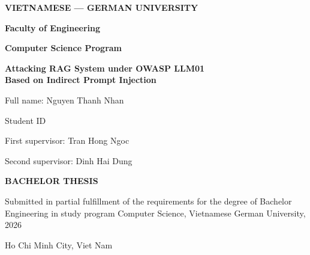 \begin{titlepage}
    \thispagestyle{empty}
    \centering

    {\Large\bfseries VIETNAMESE --- GERMAN UNIVERSITY \par}

    \vspace{1.2cm}

    {\large\bfseries Faculty of Engineering \par}
    \vspace{0.3cm}
    {\large\bfseries Computer Science Program \par}

    \vspace{2.5cm}

    {\Large\bfseries Attacking RAG System under OWASP LLM01\\
    Based on Indirect Prompt Injection \par}

    \vspace{1.5cm}

    Full name: Nguyen Thanh Nhan \par
    \vspace{1cm}
    Student ID \par
    \vspace{0.2cm}
    First supervisor: Tran Hong Ngoc \par
    \vspace{0.2cm}
    Second supervisor: Dinh Hai Dung \par

    \vspace{1.5cm}

    {\Large\bfseries BACHELOR THESIS \par}

    \vspace{2.5cm}

    Submitted in partial fulfillment of the requirements for the degree of Bachelor
    Engineering in study program Computer Science, Vietnamese \- German University, 2026 \par

    \vfill

    {\large Ho Chi Minh City, Viet Nam \par}

    \vspace{1cm}
\end{titlepage}
